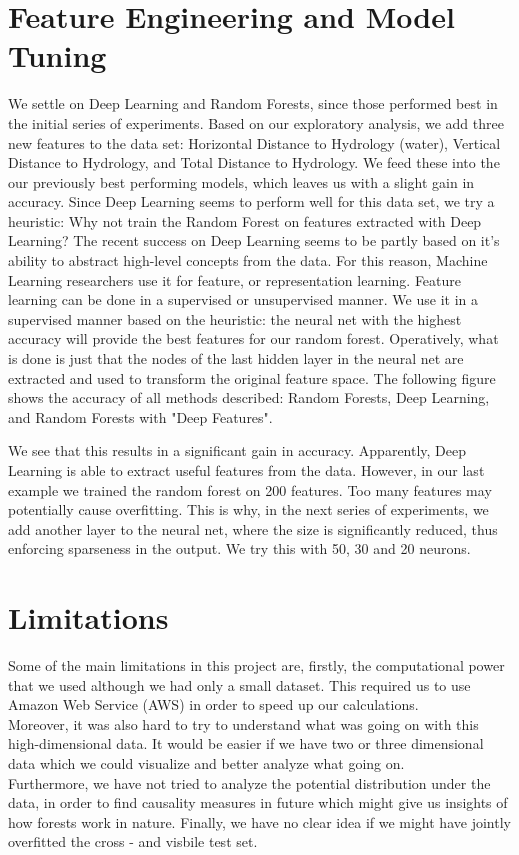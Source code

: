 \documentclass[paper=a4, fontsize=12pt]{scrartcl}
\numberwithin{equation}{section}
\numberwithin{figure}{section}
\numberwithin{table}{section}
\begin{document}
\newpage

\section{Feature Engineering and Model Tuning}
We settle on Deep Learning and Random Forests, since those performed best in the initial series of experiments. Based on our exploratory analysis, we add three new features to the data set: Horizontal Distance to Hydrology (water), Vertical Distance to Hydrology, and Total Distance to Hydrology. We feed these into the our previously best performing models, which leaves us with a slight gain in accuracy. 
Since Deep Learning seems to perform well for this data set, we try a heuristic: Why not train the Random Forest on features extracted with Deep Learning? The recent success on Deep Learning seems to be partly based on it's ability to abstract high-level concepts from the data. For this reason, Machine Learning researchers use it for feature, or representation learning. Feature learning can be done in a supervised or unsupervised manner. We use it in a supervised manner based on the heuristic: the neural net with the highest accuracy will provide the best features for our random forest. Operatively, what is done is just that the nodes of the last hidden layer in the neural net are extracted and used to transform the original feature space. The following figure shows the accuracy of all methods described: Random Forests, Deep Learning, and Random Forests with "Deep Features". 


We see that this results in a significant gain in accuracy. Apparently, Deep Learning is able to extract useful features from the data. However, in our last example we trained the random forest on 200 features. Too many features may potentially cause overfitting. This is why, in the next series of experiments, we add another layer to the neural net, where the size is significantly reduced, thus enforcing sparseness in the output. We try this with 50, 30 and 20 neurons. 




\section{Limitations}
Some of the main limitations in this project are, firstly, the computational power that we used although we had only a small dataset. This required us to use Amazon Web Service (AWS) in order to speed up our calculations. \\
Moreover, it was also hard to try to understand what was going on with this high-dimensional data. It would be easier if we have two or three dimensional data which we could visualize and better analyze what going on. \\
Furthermore, we have not tried to analyze the potential distribution under the data, in order to find causality measures in future which might give us insights of how forests work in nature. 
Finally, we have no clear idea if we might have jointly overfitted the cross - and visbile test set. 
\end{document}
